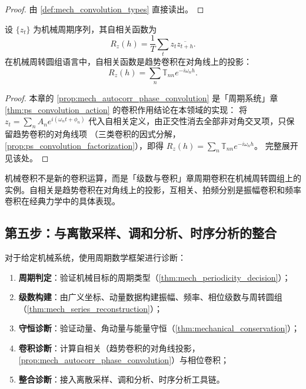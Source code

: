 \begin{proof}
由 \cref{def:mech_convolution_types} 直接读出。
\end{proof}

\begin{proposition}[自相关与趋势卷积]\label{prop:mech_autocorr_phase_convolution}
设 $\{z_t\}$ 为机械周期序列，其自相关函数为
\[
R_z(h)=\frac1T\sum_t z_t\overline{z_{t+h}}.
\]
在机械周转圆组语言中，自相关函数是趋势卷积在对角线上的投影：
\[
R_z(h)=\sum_n\mathbb T_{nn}e^{-i\omega_n h}.
\]
\end{proposition}

\begin{proof}
本章的 \cref{prop:mech_autocorr_phase_convolution} 是「周期系统」章 \cref{thm:ps_convolution_action} 的卷积作用结论在本领域的实现：
将 $z_t=\sum_n A_n e^{i(\omega_n t+\phi_n)}$ 代入自相关定义，由正交性消去全部非对角交叉项，只保留趋势卷积的对角线项
（三类卷积的因式分解，\cref{prop:ps_convolution_factorization}），即得 $R_z(h)=\sum_n\mathbb T_{nn}e^{-i\omega_n h}$。
完整展开见该处。
\end{proof}

\begin{remark}[机械卷积与周期卷积的关系]\label{rem:mech_convolution_relation}
机械卷积不是新的卷积运算，而是「级数与卷积」章周期卷积在机械周转圆组上的实例。自相关是趋势卷积在对角线上的投影，互相关、拍频分别是振幅卷积和频率卷积在经典力学中的具体表现。
\end{remark}

\subsection{第五步：与离散采样、调和分析、时序分析的整合}

\begin{definition}[机械周期诊断流程]\label{def:mech_periodic_diagnosis}
对于给定机械系统，使用周期数学框架进行诊断：
\begin{enumerate}[label=(\roman*)]
    \item \textbf{周期判定}：验证机械目标的周期类型（\cref{thm:mech_periodicity_decision}）；
    \item \textbf{级数构建}：由广义坐标、动量数据构建振幅、频率、相位级数与周转圆组（\cref{thm:mech_series_reconstruction}）；
    \item \textbf{守恒诊断}：验证动量、角动量与能量守恒（\cref{thm:mechanical_conservation}）；
    \item \textbf{卷积诊断}：计算自相关（趋势卷积的对角线投影，\cref{prop:mech_autocorr_phase_convolution}）与相位卷积；
    \item \textbf{整合诊断}：接入离散采样、调和分析、时序分析工具链。
\end{enumerate}
\end{definition}

